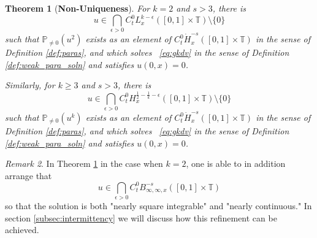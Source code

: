 \documentclass[12pt,reqno,letterpaper]{amsart}
\numberwithin{equation}{section}
\newcommand{\1}{{\bf 1}}
\newcommand{\2}{{\bf 2}}
\newcommand{\T}{\mathbb T}
\newtheorem{theorem}{Theorem}[section]
\theoremstyle{remark}
\newtheorem{remark}[theorem]{Remark}
\theoremstyle{remark}
\begin{document}
\begin{theorem}[\textbf{Non-Uniqueness}]\label{thm:main}
     For $k=2$ and $s > 3$, there is
     $$
     u \in \bigcap_{\epsilon>0} C_t^0L^{k-\epsilon}_x([0,1] \times \T) \setminus \{0\}
     $$
     such that $\mathbb{P}_{\not=0}(u^2)$ exists as an element of $C_t^0\dot{H}_x^{-s}([0,1] \times \T)$ in the sense of Definition \ref{def:paras}, and which solves ~\eqref{eq:gkdv} in the sense of Definition \ref{def:weak_para_soln} and satisfies $u(0,x) = 0$.
     
     Similarly, for $k \geq 3$ and $s > 3$, there is
     $$
     u \in \bigcap_{\epsilon>0} C_t^0H^{\frac{1}{2}- \frac{1}{k}-\epsilon}_x([0,1] \times \T) \setminus \{0\}
     $$
     such that $\mathbb{P}_{\not=0}(u^k)$ exists as an element of $C_t^0\dot{H}_x^{-s}([0,1] \times \T)$ in the sense of Definition \ref{def:paras}, and which solves ~\eqref{eq:gkdv} in the sense of Definition \ref{def:weak_para_soln} and satisfies $u(0,x) = 0$.
\end{theorem}

\begin{remark}
    In Theorem \ref{thm:main} in the case when $k=2$, one is able to in addition arrange that
    $$
    u \in \bigcap_{\epsilon > 0} C_t^0 B^{-s}_{\infty,\infty,x}([0,1] \times \T)
    $$
    so that the solution is both "nearly square integrable" and "nearly continuous." In section \ref{subsec:intermittency} we will discuss how this refinement can be achieved.
\end{remark}
\end{document}
